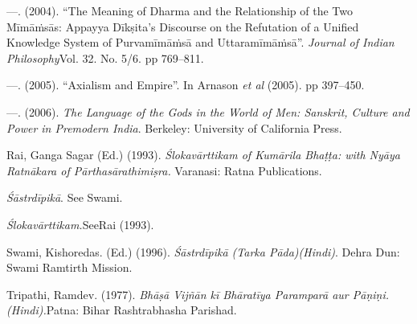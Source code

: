 \begin{thebibliography}{99}
  —. (2004). “The Meaning of Dharma and the Relationship of the Two Mīmāṁsās: Appayya Dīkṣita’s Discourse on the Refutation of a Unified Knowledge System of Purvamīmāṁsā and Uttaramīmāṁsā”. \textit{Journal of Indian Philosophy}Vol. 32. No. 5/6. pp 769–811. 

  —. (2005). “Axialism and Empire”. In Arnason \textit{et al} (2005). pp 397–450.

  —. (2006). \textit{The Language of the Gods in the World of Men: Sanskrit, Culture and Power in Premodern India}. Berkeley: University of California Press.

  Rai, Ganga Sagar (Ed.) (1993). \textit{Ślokavārttikam of Kumārila Bhaṭṭa: with Nyāya Ratnākara of Pārthasārathimiṣra.} Varanasi: Ratna Publications.

  \textit{Śāstrdīpikā}. See Swami.

  \textit{Ślokavārttikam.}SeeRai (1993).

  Swami, Kishoredas. (Ed.) (1996). \textit{Śāstrdīpikā (Tarka Pāda)(Hindi)}. Dehra Dun: Swami Ramtirth Mission.

  Tripathi, Ramdev. (1977). \textit{Bhāṣā Vijñān kī Bhāratīya Paramparā aur Pāṇiṇi. (Hindi).}Patna: Bihar Rashtrabhasha Parishad.

 \end{thebibliography}

